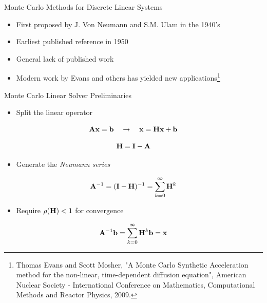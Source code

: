 \documentclass{beamer}
\begin{document}
\begin{frame}{Monte Carlo Methods for Discrete Linear Systems}

  \begin{itemize}
  \item First proposed by J. Von Neumann and S.M. Ulam in the 1940's
    \medskip \medskip
  \item Earliest published reference in 1950
    \medskip \medskip
  \item General lack of published work
    \medskip \medskip
  \item Modern work by Evans and others has yielded new
    applications\let\thefootnote\relax\footnote{\tiny{Thomas Evans and
        Scott Mosher, "A Monte Carlo Synthetic Acceleration method for
        the non-linear, time-dependent diffusion equation", American
        Nuclear Society - International Conference on Mathematics,
        Computational Methods and Reactor Physics, 2009.}}
  \end{itemize}

\end{frame}

\begin{frame}{Monte Carlo Linear Solver Preliminaries}

  \begin{itemize}
  \item Split the linear operator
  \end{itemize}

  \[
  \mathbf{A}\mathbf{x} = \mathbf{b} \ \ \ \rightarrow \ \ \ \mathbf{x} = \mathbf{H} \mathbf{x}
  + \mathbf{b}
  \]

  \[
  \mathbf{H} = \mathbf{I} - \mathbf{A}
  \]

  \medskip
  \begin{itemize}
  \item Generate the \textit{Neumann series}
  \end{itemize}
  
  \[
  \mathbf{A}^{-1} = (\mathbf{I}-\mathbf{H})^{-1} = \sum_{k=0}^{\infty} \mathbf{H}^k
  \]

  \medskip
  \begin{itemize}
  \item Require $\rho(\mathbf{H}) < 1$ for convergence
  \end{itemize}

  \[
  \mathbf{A}^{-1}\mathbf{b} = \sum_{k=0}^{\infty} \mathbf{H}^k\mathbf{b} = \mathbf{x}
  \]

\end{frame}
\end{document}
